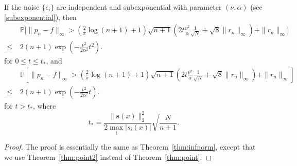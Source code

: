 \documentclass[final,onefignum,onetabnum]{siamart220329}
\newcommand{\vct}[1]{\bm{#1}}
\begin{document}
\begin{theorem}\label{thm:infnorm2}
	If the noise $ \{ \epsilon_i \}$ are independent and subexponential with parameter $(\nu,\alpha)$ (see \eqref{subexponential}), then \begin{align*}
		&\mathbb{P}\bigg[\| p_n-f \|_{\infty}>\left( \frac{2}{\pi}\log(n+1)+1 \right) \sqrt{n+1} \left( 2 t \frac{\nu^2}{\alpha} \frac{1}{\sqrt{N}}+\sqrt{8} \|r_n\|_\infty \right) + \|r_n\|_\infty \bigg] \nonumber \\
		\leq \ & 2(n+1)\exp \left( -\frac{\nu^2}{2 \alpha^2} t^2 \right).
	\end{align*}
	for $0 \leq t \leq t_*$, and
	\begin{align*}
		& \mathbb{P} \left[ \| p_n-f \|_{\infty} >\left( \frac{2}{\pi}\log(n+1)+1 \right) \sqrt{n+1} \left( 2 t \frac{\nu^2}{\alpha} \frac{1}{\sqrt{N}}+\sqrt{8} \|r_n\|_\infty \right) + \|r_n\|_\infty \right] \\
		\leq \ & 2(n+1) \exp \left( -\frac{\nu^2}{2 \alpha^2} t \right). 
	\end{align*}
	for $t > t_*$, where
	\[
	t_* = \frac{\|\vct{s}(x)\|_2^2}{2 \max_i |s_i(x)|} \sqrt{\frac{N}{n+1}}.
	\]
\end{theorem}
\begin{proof}
	The proof is essentially the same {as} Theorem~\ref{thm:infnorm}, {except that} we use Theorem~\ref{thm:point2} instead of Theorem~\ref{thm:point}. \end{proof}
\end{document}
